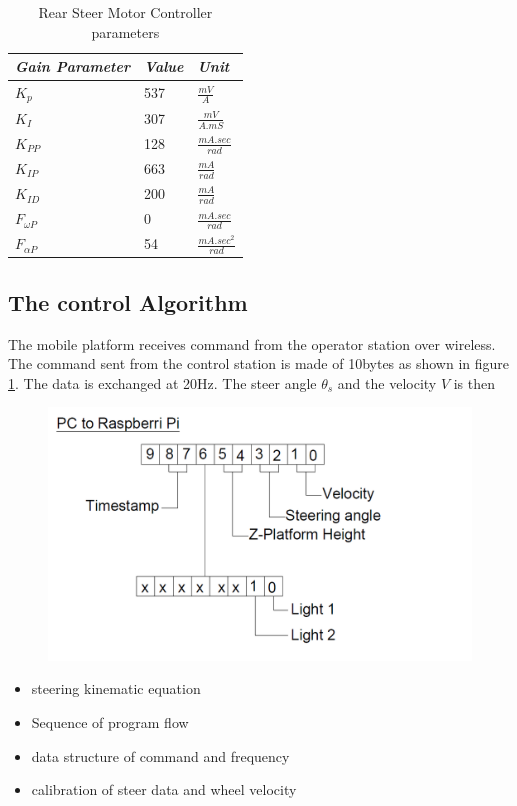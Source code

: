 \begin{table}[!htbp]
	\caption{ Rear Steer Motor Controller  parameters }
	\label{tb:steer}
	\centering
	\begin{tabular}{l l l}
		\hline
		\emph{Gain Parameter}  & \emph{ Value} & \emph{Unit} \\
		\hline
		$K_p$  & 537 &  $\frac{mV}{A}$ \\ 
		$K_I $ & 307 & $\frac{mV}{A.mS}$ \\
		$K_{PP}$& 128 & $ \frac{mA.sec}{rad}$\\
		$K_{IP}$&663&$\frac{mA}{rad}$\\
		$K_{ID}$&200&$\frac{mA}{rad}$\\
		$F_{\omega P}$& 0& $ \frac{mA.sec}{rad}$\\
		$F_{\alpha P}$& 54& $ \frac{mA.sec^2}{rad}$\\
		\hline
	\end{tabular}
\end{table}
\subsection{The control Algorithm}
The mobile platform receives command from the operator station over wireless. The command sent from the control station is made of  10bytes as shown in figure \ref{fig:sentBytes}. The data is exchanged at 20Hz.  The steer angle $\theta_s$ and the velocity $V$ is then 
\begin{figure}
	\includegraphics[width=\linewidth,keepaspectratio]{Chapter5/fig/bitconfig}
	\label{fig:sentBytes} 
\end{figure}
 
\begin{itemize}
\item steering kinematic equation
\item Sequence of program flow
\item data structure of command  and  frequency
\item calibration of steer data and wheel velocity
\end{itemize}
